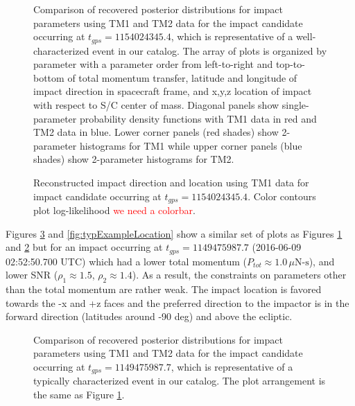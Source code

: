 \documentclass[twocolumn, trackchanges]{aastex61}
\newcommand{\red}[1]{\textcolor{red}{#1}}
\begin{document}
\begin{figure}[h!]
\caption{Comparison of recovered posterior distributions for impact parameters using TM1 and TM2 data for the impact candidate occurring at $t_{gps}=1154024345.4$, which is representative of a well-characterized event in our catalog. The array of plots is organized by parameter with a parameter order from left-to-right and top-to-bottom of total momentum transfer, latitude and longitude of impact direction in  spacecraft frame, and x,y,z location of impact with respect to S/C center of mass. Diagonal panels show single-parameter probability density functions with TM1 data in red and TM2 data in blue. Lower corner panels (red shades) show 2-parameter histograms for TM1 while upper corner panels (blue shades) show 2-parameter histograms for TM2. \label{fig:goodExampleCorner}}
\end{figure}


\begin{figure}[h!]
\gridline{
\fig{figures/goodSky.eps}{\columnwidth}{(a) Impact origin in \red{frame name?} frame}}
\caption{Reconstructed impact direction and location using TM1 data for impact candidate occurring at $t_{gps}=1154024345.4$. Color contours plot log-likelihood \red{we need a colorbar}.\label{fig:goodExampleLocation}}
\end{figure}

Figures \ref{fig:typExampleCorner} and \ref{fig:typExampleLocation} show a similar set of plots as Figures \ref{fig:goodExampleCorner} and \ref{fig:goodExampleLocation} but for an impact occurring at $t_{gps} = 1149475987.7$ (2016-06-09 02:52:50.700 UTC) which had a lower total momentum ($P_{tot}\approx1.0\,\mu\textrm{N-s}$), and lower SNR ($\rho_1\approx1.5$, $\rho_2\approx1.4$). As a result, the constraints on parameters other than the total momentum are rather weak.  The impact location is favored towards the -x and +z faces and the preferred direction to the impactor is in the forward direction (latitudes around -90 deg) and above the ecliptic.


\begin{figure}[h!]
\caption{Comparison of recovered posterior distributions for impact parameters using TM1 and TM2 data for the impact candidate occurring at $t_{gps}=1149475987.7$, which is representative of a typically characterized event in our catalog. The plot arrangement is the same as Figure \ref{fig:goodExampleCorner}.\label{fig:typExampleCorner}}
\end{figure}
\end{document}
